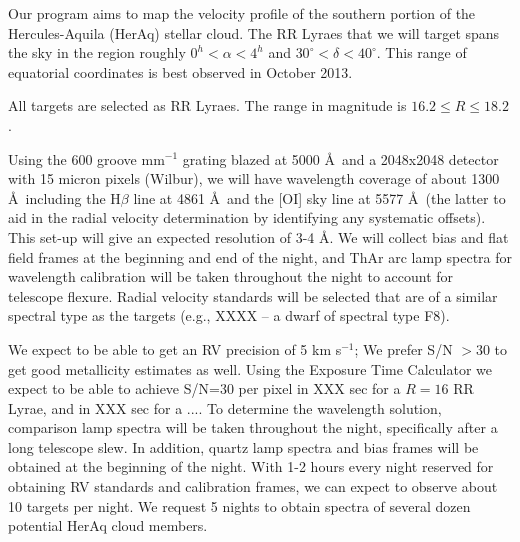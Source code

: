 %
%

\feasibility
Our program aims to map the velocity profile of the southern portion of the Hercules-Aquila (HerAq) stellar
cloud.
The RR Lyraes that we will target spans the sky in the region roughly $0^{h}<\alpha<4^{h}$ and $30^{\circ}<\delta<40^{\circ}$.
This range of equatorial coordinates is best observed in October 2013.

All targets are selected as RR Lyraes.
The range in magnitude is $16.2 \le R \le 18.2$.

Using the 600 groove mm$^{-1}$ grating blazed at 5000 \AA\ and a 2048x2048 detector with 15 micron pixels (Wilbur), we will have wavelength coverage of about 1300 \AA\, including the H$\beta$ line at 4861 \AA\ and the [OI] sky line at 5577 \AA\ (the latter to aid in the radial velocity determination by identifying any systematic offsets).
This set-up will give an expected resolution of 3-4 \AA.
We will collect bias and flat field frames at the beginning and end of the night, and ThAr arc lamp spectra for wavelength calibration will be taken throughout the night to account for telescope flexure.  Radial velocity standards will be selected that are of a similar spectral type as the targets (e.g., XXXX  -- a dwarf of spectral type F8).


We expect to
be able to get an RV precision of 5 km s$^{-1}$;
We prefer S/N $>30$ to get good metallicity estimates as well.
Using the Exposure Time Calculator we expect to be able to
achieve S/N=30 per pixel in XXX sec for
a $R=16$ RR Lyrae, and in XXX sec for a ....
To determine the wavelength solution, comparison lamp spectra will be taken throughout the night, specifically after a long telescope slew. In addition, quartz lamp spectra and bias frames will be obtained at the beginning of the night.
With 1-2 hours every night reserved for obtaining
RV standards and calibration frames, we can expect to observe about
10 targets per night.
We request 5 nights to obtain spectra of several dozen potential HerAq cloud members.

